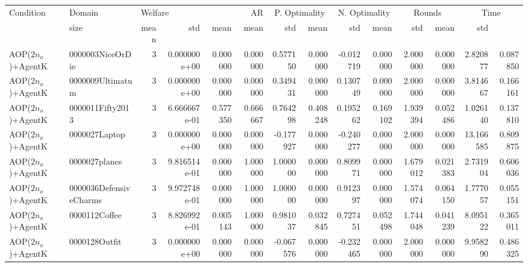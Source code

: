 \begin{tabular}{llrr|r|rr|rr|rr|rrr}
\toprule
                Condition &                 Domain & \multicolumn{3}{l}{Welfare} &       AR & \multicolumn{2}{c}{P. Optimality} & \multicolumn{2}{c}{N. Optimality} & \multicolumn{2}{c}{Rounds} & \multicolumn{2}{c}{Time} \\
                          &    size &         mean &      std &     mean &          mean &      std &          mean &      std &          mean &         std &         mean &         std \\
\midrule
      AOP($2 n_o$)+AgentK &       0000003NiceOrDie &       3 & 0.000000e+00 & 0.000000 & 0.000000 &      0.577150 & 0.000000 &     -0.012719 & 0.000000 &      2.000000 &    0.000000 &     2.820877 &    0.087850 \\
      AOP($2 n_o$)+AgentK &       0000009Ultimatum &       3 & 0.000000e+00 & 0.000000 & 0.000000 &      0.349431 & 0.000000 &      0.130749 & 0.000000 &      2.000000 &    0.000000 &     3.814667 &    0.166161 \\
      AOP($2 n_o$)+AgentK &       0000011Fifty2013 &       3 & 6.666667e-01 & 0.577350 & 0.666667 &      0.764298 & 0.408248 &      0.195262 & 0.169102 &      1.939394 &    0.052486 &     1.026140 &    0.137810 \\
      AOP($2 n_o$)+AgentK &          0000027Laptop &       3 & 0.000000e+00 & 0.000000 & 0.000000 &     -0.177927 & 0.000000 &     -0.240277 & 0.000000 &      2.000000 &    0.000000 &    13.166585 &    0.809875 \\
      AOP($2 n_o$)+AgentK &          0000027planes &       3 & 9.816514e-01 & 0.000000 & 1.000000 &      1.000000 & 0.000000 &      0.809971 & 0.000000 &      1.679012 &    0.021383 &     2.731904 &    0.606036 \\
      AOP($2 n_o$)+AgentK & 0000036DefensiveCharms &       3 & 9.972748e-01 & 0.000000 & 1.000000 &      1.000000 & 0.000000 &      0.912397 & 0.000000 &      1.574074 &    0.064150 &     1.777057 &    0.055151 \\
      AOP($2 n_o$)+AgentK &          0000112Coffee &       3 & 8.826992e-01 & 0.005143 & 1.000000 &      0.981037 & 0.032845 &      0.727451 & 0.052498 &      1.744048 &    0.041239 &     8.095122 &    0.365011 \\
      AOP($2 n_o$)+AgentK &          0000128Outfit &       3 & 0.000000e+00 & 0.000000 & 0.000000 &     -0.067576 & 0.000000 &     -0.232465 & 0.000000 &      2.000000 &    0.000000 &     9.958290 &    0.486325 \\

\end{tabular}
